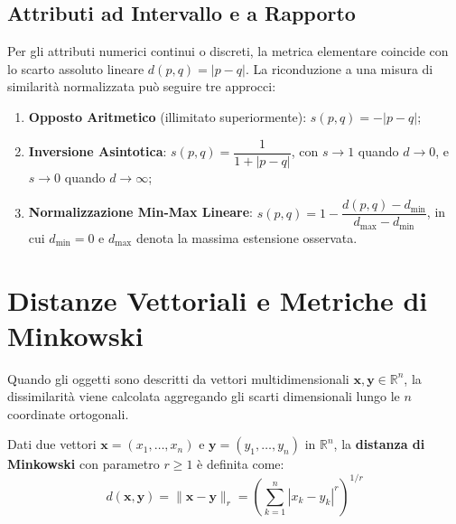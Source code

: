 \subsection{Attributi ad Intervallo e a Rapporto}
Per gli attributi numerici continui o discreti, la metrica elementare coincide con lo scarto assoluto lineare $d(p, q) = |p - q|$. La riconduzione a una misura di similarità normalizzata può seguire tre approcci:
\begin{enumerate}
    \item \textbf{Opposto Aritmetico} (illimitato superiormente): $s(p, q) = -|p - q|$;
    \item \textbf{Inversione Asintotica}: $s(p, q) = \dfrac{1}{1 + |p - q|}$, con $s \to 1$ quando $d \to 0$, e $s \to 0$ quando $d \to \infty$;
    \item \textbf{Normalizzazione Min-Max Lineare}: $s(p, q) = 1 - \dfrac{d(p, q) - d_{\min}}{d_{\max} - d_{\min}}$, in cui $d_{\min} = 0$ e $d_{\max}$ denota la massima estensione osservata.
\end{enumerate}

\section{Distanze Vettoriali e Metriche di Minkowski}
\label{sec:dm-vector-minkowski-distances}

Quando gli oggetti sono descritti da vettori multidimensionali $\mathbf{x}, \mathbf{y} \in \mathbb{R}^n$, la dissimilarità viene calcolata aggregando gli scarti dimensionali lungo le $n$ coordinate ortogonali.

\begin{definition}
Dati due vettori $\mathbf{x} = (x_1, \dots, x_n)$ e $\mathbf{y} = (y_1, \dots, y_n)$ in $\mathbb{R}^n$, la \textbf{distanza di Minkowski} con parametro $r \ge 1$ è definita come:
\begin{equation}
    d(\mathbf{x}, \mathbf{y}) = \|\mathbf{x} - \mathbf{y}\|_r = \left( \sum_{k=1}^n |x_k - y_k|^r \right)^{1/r}
    \label{eq:dm-minkowski}
\end{equation}
\end{definition}

